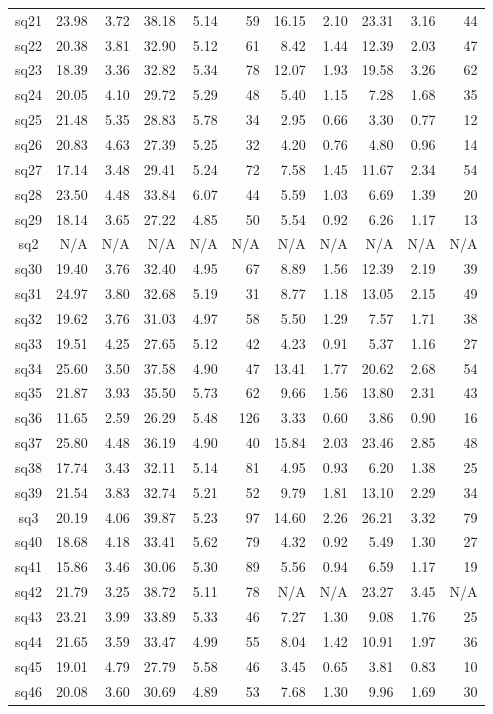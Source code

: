 {\begin{longtable}{@{}cr@{\hspace{1em}}r@{\hspace{1em}}r@{\hspace{1em}}r@{\hspace{1em}}r@{\hspace{2em}}r@{\hspace{1em}}r@{\hspace{1em}}r@{\hspace{1em}}r@{\hspace{1em}}r@{}}
sq21&23.98&3.72&38.18&5.14&59&16.15&2.10&23.31&3.16&44\\
sq22&20.38&3.81&32.90&5.12&61&8.42&1.44&12.39&2.03&47\\
sq23&18.39&3.36&32.82&5.34&78&12.07&1.93&19.58&3.26&62\\
sq24&20.05&4.10&29.72&5.29&48&5.40&1.15&7.28&1.68&35\\
sq25&21.48&5.35&28.83&5.78&34&2.95&0.66&3.30&0.77&12\\
sq26&20.83&4.63&27.39&5.25&32&4.20&0.76&4.80&0.96&14\\
sq27&17.14&3.48&29.41&5.24&72&7.58&1.45&11.67&2.34&54\\
sq28&23.50&4.48&33.84&6.07&44&5.59&1.03&6.69&1.39&20\\
sq29&18.14&3.65&27.22&4.85&50&5.54&0.92&6.26&1.17&13\\
sq2&N/A&N/A&N/A&N/A&N/A&N/A&N/A&N/A&N/A&N/A\\
sq30&19.40&3.76&32.40&4.95&67&8.89&1.56&12.39&2.19&39\\
sq31&24.97&3.80&32.68&5.19&31&8.77&1.18&13.05&2.15&49\\
sq32&19.62&3.76&31.03&4.97&58&5.50&1.29&7.57&1.71&38\\
sq33&19.51&4.25&27.65&5.12&42&4.23&0.91&5.37&1.16&27\\
sq34&25.60&3.50&37.58&4.90&47&13.41&1.77&20.62&2.68&54\\
sq35&21.87&3.93&35.50&5.73&62&9.66&1.56&13.80&2.31&43\\
sq36&11.65&2.59&26.29&5.48&126&3.33&0.60&3.86&0.90&16\\
sq37&25.80&4.48&36.19&4.90&40&15.84&2.03&23.46&2.85&48\\
sq38&17.74&3.43&32.11&5.14&81&4.95&0.93&6.20&1.38&25\\
sq39&21.54&3.83&32.74&5.21&52&9.79&1.81&13.10&2.29&34\\
sq3&20.19&4.06&39.87&5.23&97&14.60&2.26&26.21&3.32&79\\
sq40&18.68&4.18&33.41&5.62&79&4.32&0.92&5.49&1.30&27\\
sq41&15.86&3.46&30.06&5.30&89&5.56&0.94&6.59&1.17&19\\
sq42&21.79&3.25&38.72&5.11&78&N/A&N/A&23.27&3.45&N/A\\
sq43&23.21&3.99&33.89&5.33&46&7.27&1.30&9.08&1.76&25\\
sq44&21.65&3.59&33.47&4.99&55&8.04&1.42&10.91&1.97&36\\
sq45&19.01&4.79&27.79&5.58&46&3.45&0.65&3.81&0.83&10\\
sq46&20.08&3.60&30.69&4.89&53&7.68&1.30&9.96&1.69&30\\

\end{longtable}}
